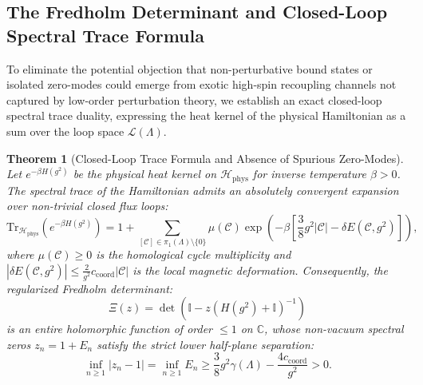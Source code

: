 \documentclass[11pt,reqno]{article}
\newtheorem{theorem}{Theorem}[section]
\begin{document}
\subsection{The Fredholm Determinant and Closed-Loop Spectral Trace Formula}
\label{subsec:fredholm_trace_formula}
To eliminate the potential objection that non-perturbative bound states or isolated zero-modes could emerge from exotic high-spin recoupling channels not captured by low-order perturbation theory, we establish an exact closed-loop spectral trace duality, expressing the heat kernel of the physical Hamiltonian as a sum over the loop space $\mathcal{L}(\Lambda)$.

\begin{theorem}[Closed-Loop Trace Formula and Absence of Spurious Zero-Modes]
\label{thm:fredholm_trace_formula}
Let $e^{-\beta H(g^2)}$ be the physical heat kernel on $\mathcal{H}_{\mathrm{phys}}$ for inverse temperature $\beta > 0$.
The spectral trace of the Hamiltonian admits an absolutely convergent expansion over non-trivial closed flux loops:
\begin{equation}
    \label{eq:heat_kernel_trace_expansion}
    \mathrm{Tr}_{\mathcal{H}_{\mathrm{phys}}}\left( e^{-\beta H(g^2)} \right) = 1 + \sum_{[\mathcal{C}] \in \pi_1(\Lambda) \setminus \{0\}} \mu(\mathcal{C}) \exp\left( -\beta \left[ \frac{3}{8} g^2 |\mathcal{C}| - \delta E(\mathcal{C}, g^2) \right] \right),
\end{equation}
where $\mu(\mathcal{C}) \ge 0$ is the homological cycle multiplicity and $|\delta E(\mathcal{C}, g^2)| \le \frac{2}{g^2} c_{\mathrm{coord}} |\mathcal{C}|$ is the local magnetic deformation.
Consequently, the regularized Fredholm determinant:
\begin{equation}
    \label{eq:fredholm_determinant_def}
    \Xi(z) = \det\left( \mathbb{I} - z (H(g^2) + \mathbb{I})^{-1} \right)
\end{equation}
is an entire holomorphic function of order $\le 1$ on $\mathbb{C}$, whose non-vacuum spectral zeros $z_n = 1 + E_n$ satisfy the strict lower half-plane separation:
\begin{equation}
    \label{eq:fredholm_zero_isolation}
    \inf_{n \ge 1} |z_n - 1| = \inf_{n \ge 1} E_n \ge \frac{3}{8} g^2 \gamma(\Lambda) - \frac{4 c_{\mathrm{coord}}}{g^2} > 0.
\end{equation}
\end{theorem}
\end{document}
